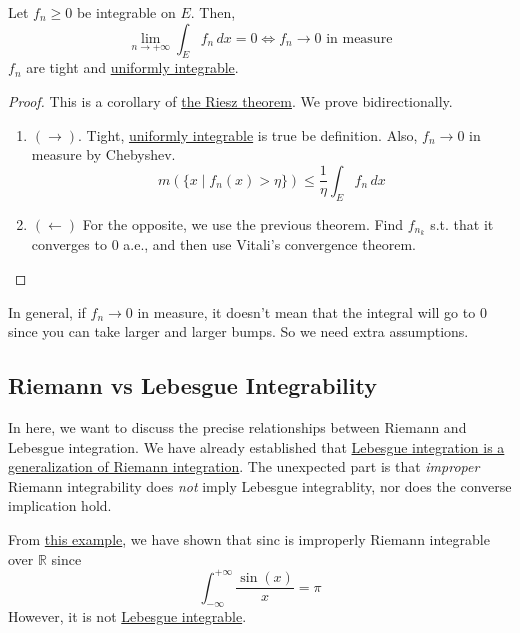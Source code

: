   \begin{corollary}
    \label{thm:riesz-theorem-for-nonnegative-integrable}
		Let $f_n \geq 0$ be integrable on $E$. Then, 
    \begin{equation}
      \lim_{n \to +\infty} \int_E f_n \,dx = 0  \iff f_n \to 0 \text{ in measure}
    \end{equation}
    $f_n$ are tight and \hyperref[def:uniformly-integrable]{uniformly integrable}. 
  \end{corollary}
  \begin{proof}
    This is a corollary of \hyperref[thm:riesz]{the Riesz theorem}. We prove bidirectionally. 
    \begin{enumerate}
      \item $(\rightarrow)$. Tight, \hyperref[def:uniformly-integrable]{uniformly integrable} is true be definition. Also, $f_n \to 0$ in measure by Chebyshev. 
        \begin{equation}
          m(\{x \mid f_n (x) > \eta\}) \leq \frac{1}{\eta} \int_E f_n \,dx 
        \end{equation}
      \item $(\leftarrow)$ For the opposite, we use the previous theorem. Find $f_{n_k}$ s.t. that it converges to $0$ a.e., and then use Vitali's convergence theorem. 
    \end{enumerate}
  \end{proof}

  In general, if $f_n \to 0$ in measure, it doesn't mean that the integral will go to $0$ since you can take larger and larger bumps. So we need extra assumptions. 

\subsection{Riemann vs Lebesgue Integrability} 

  In here, we want to discuss the precise relationships between Riemann and Lebesgue integration. We have already established that \hyperref[thm:leb-gen-riem]{Lebesgue integration is a generalization of Riemann integration}. The unexpected part is that \textit{improper} Riemann integrability does \textit{not} imply Lebesgue integrablity, nor does the converse implication hold. 

  \begin{example}
    \label{ex:improperly-riemann-integrable-but-not-lebesgue}
    From \hyperref[real-ex:sinc]{this example}, we have shown that 
    sinc is improperly Riemann integrable over $\mathbb{R}$ since 
    \begin{equation}
      \int_{-\infty}^{+\infty} \frac{\sin(x)}{x} = \pi
    \end{equation}
    However, it is not \hyperref[def:leb-int-signed]{Lebesgue integrable}. 
  \end{example}


